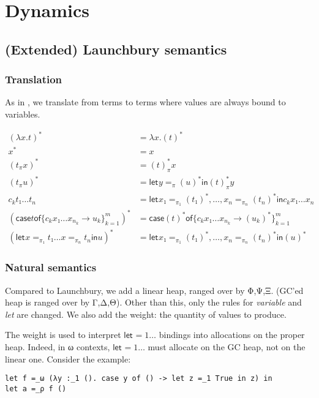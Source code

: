 \documentclass[11pt]{article}
\newcommand{\case}[2]{\mathsf{case} #1 \mathsf{of} \{#2\}^m_{k=1}}
\newcommand{\flet}[1][]{\mathsf{let}_{#1} }
\newcommand{\fin}{ \mathsf{in} }
\begin{document}
\section{Dynamics}
\label{sec:orgheadline16}
\subsection{(Extended) Launchbury semantics}
\label{sec:orgheadline11}

\subsubsection{Translation}
\label{sec:orgheadline9}
As in \textcite{launchbury_natural_1993}, we translate from terms to
terms where values are always bound to variables. 


\begin{align*}
(λx. t)^* &= λx. (t)^* \\
x^*       &= x \\
  (t_π  x )^* &= (t)^*_π  x \\
  (t_π  u )^* &= \flet y =_{π} (u)^* \fin (t)^*_π  y \\
c_k  t₁ … t_n &= \flet x₁ =_{π_1} (t₁)^*,…, x_n =_{π_n} (t_n)^* \fin c_k x₁ … x_n \\
(\case t {c_k  x₁ … x_{n_k} → u_k})^* &= \case {(t)^*} {c_k  x₁ … x_{n_k} → (u_k)^*} \\
(\flet x =_{π₁} t₁  …  x =_{π_n} t_n \fin u)^* & = \flet x₁ =_{π_1} (t₁)^*,…, x_n =_{π_n} (t_n)^* \fin (u)^*
\end{align*}

\subsubsection{Natural semantics}
Compared to Launchbury, we add a linear heap, ranged over by Φ,Ψ,Ξ.
(GC'ed heap is ranged over by Γ,Δ,Θ). Other than this, only the rules
for \emph{variable} and \emph{let} are changed. We also add the
weight: the quantity of values to produce.

The weight is used to interpret $\flet =1 …$ bindings into allocations on
the proper heap.  Indeed, in ω contexts, $\flet =1 …$ must allocate on the
GC heap, not on the linear one. Consider the example:

\begin{verbatim}
let f =_ω (λy :_1 (). case y of () -> let z =_1 True in z) in
let a =_ρ f ()
\end{verbatim}
\end{document}
